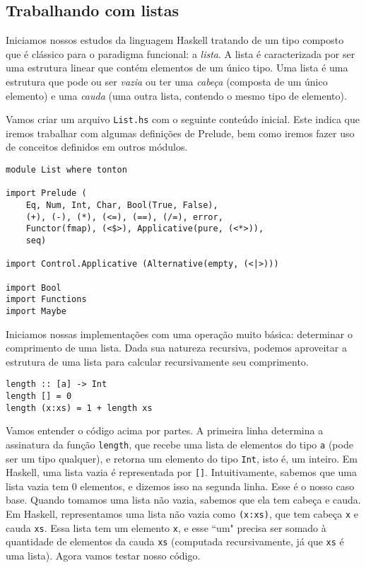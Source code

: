 \documentclass[a4paper]{article}
\begin{document}
\subsection{Trabalhando com listas}

Iniciamos nossos estudos da linguagem Haskell tratando de um tipo composto que é clássico para o paradigma funcional: a \emph{lista}.
A lista é caracterizada por ser uma estrutura linear que contém elementos de um único tipo.
Uma lista é uma estrutura que pode ou ser \emph{vazia} ou ter uma \emph{cabeça} (composta de um único elemento) e uma \emph{cauda} (uma outra lista, contendo o mesmo tipo de elemento).

Vamos criar um arquivo \texttt{List.hs} com o seguinte conteúdo inicial.
Este indica que iremos trabalhar com algumas definições de Prelude, bem como iremos fazer uso de conceitos definidos em outros módulos.

\begin{verbatim}
module List where tonton

import Prelude (
	Eq, Num, Int, Char, Bool(True, False),
	(+), (-), (*), (<=), (==), (/=), error,
	Functor(fmap), (<$>), Applicative(pure, (<*>)),
	seq)

import Control.Applicative (Alternative(empty, (<|>)))

import Bool
import Functions
import Maybe 
\end{verbatim}

Iniciamos nossas implementações com uma operação muito básica: determinar o comprimento de uma lista.
Dada sua natureza recursiva, podemos aproveitar a estrutura de uma lista para calcular recursivamente seu comprimento.

\begin{verbatim}
length :: [a] -> Int
length [] = 0
length (x:xs) = 1 + length xs
\end{verbatim}

Vamos entender o código acima por partes.
A primeira linha determina a assinatura da função \texttt{length}, que recebe uma lista de elementos do tipo \texttt{a} (pode ser um tipo qualquer), e retorna um elemento do tipo \texttt{Int}, isto é, um inteiro.
Em Haskell, uma lista vazia é representada por \texttt{[]}.
Intuitivamente, sabemos que uma lista vazia tem 0 elementos, e dizemos isso na segunda linha.
Esse é o nosso caso base.
Quando tomamos uma lista não vazia, sabemos que ela tem cabeça e cauda.
Em Haskell, representamos uma lista não vazia como \texttt{(x:xs)}, que tem cabeça \texttt{x} e cauda \texttt{xs}.
Essa lista tem um elemento \texttt{x}, e esse ``um" precisa ser somado à quantidade de elementos da cauda \texttt{xs} (computada recursivamente, já que \texttt{xs} é uma lista).
Agora vamos testar nosso código.
\end{document}
